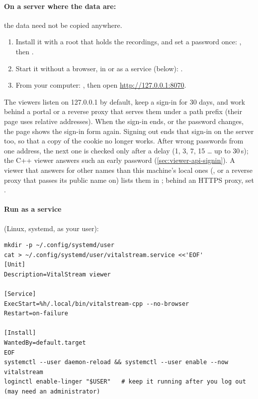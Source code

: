 \paragraph{On a server where the data are:} the data need not be copied anywhere.
\begin{enumerate}
\item Install it with a root that holds the recordings, and set a password once:
  , then
  .
\item Start it without a browser, in  or as a service (below):
  .
\item From your computer: , then open
  \url{http://127.0.0.1:8070}.
\end{enumerate}

The viewers listen on 127.0.0.1 by default, keep a sign-in for 30 days, and work behind a portal
or a reverse proxy that serves them under a path prefix (their page uses relative addresses).
When the sign-in ends, or the password changes, the page shows the sign-in form again. Signing
out ends that sign-in on the server too, so that a copy of the cookie no longer works. After
wrong passwords from one address, the next one is checked only after a delay (1, 3, 7, 15
\dots{} up to 30\,s); the C++ viewer answers such an early password 
(\cref{sec:viewer-api-signin}). A viewer that answers for other names than this machine's local
ones (, or a reverse proxy that passes its public name on) lists them in
; behind an HTTPS proxy, set .

\paragraph{Run as a service} (Linux, systemd, as your user):

\begin{lstlisting}[style=shell]
mkdir -p ~/.config/systemd/user
cat > ~/.config/systemd/user/vitalstream.service <<'EOF'
[Unit]
Description=VitalStream viewer

[Service]
ExecStart=%h/.local/bin/vitalstream-cpp --no-browser
Restart=on-failure

[Install]
WantedBy=default.target
EOF
systemctl --user daemon-reload && systemctl --user enable --now vitalstream
loginctl enable-linger "$USER"   # keep it running after you log out (may need an administrator)
\end{lstlisting}

